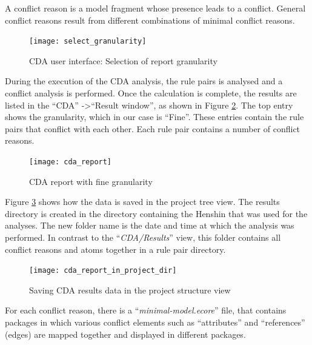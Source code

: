 A conflict reason is a model fragment whose presence leads to a conflict. General conflict reasons result from different combinations of minimal conflict reasons\cite{cda_api}.
\begin{figure}[h]
	\centering
	\texttt{[image: select\_granularity]}
	\caption{CDA user interface: Selection of report granularity}\label{fig:select_granularity}
\end{figure}
During the execution of the CDA analysis, the rule pairs is analysed and a conflict analysis is performed. Once the calculation is complete, the results are listed in the \enquote{CDA} -\textgreater \enquote{Result window}, as shown in Figure \ref{fig:cda_report}. The top entry shows the granularity, which in our case is \enquote{Fine}. These entries contain the rule pairs that conflict with each other. Each rule pair contains a number of conflict reasons.
\begin{figure}[h]
	\centering
	\texttt{[image: cda\_report]}
	\caption{CDA report with fine granularity}\label{fig:cda_report}
\end{figure}
Figure \ref{fig:cda_report_in_project_dir} shows how the data is saved in the project tree view. The results directory is created in the directory containing the Henshin that was used for the analyses. The new folder name is the date and time at which the analysis was performed. In contrast to the \enquote{\textit{CDA/Results}} view, this folder contains all conflict reasons and atoms together in a rule pair directory.
\begin{figure}[h]
	\centering
	\texttt{[image: cda\_report\_in\_project\_dir]}
	\caption{Saving CDA results data in the project structure view}\label{fig:cda_report_in_project_dir}
\end{figure}
For each conflict reason, there is a \enquote{\textit{minimal-model.ecore}} file, that contains packages in which various conflict elements such as \enquote{attributes} and \enquote{references} (edges) are mapped together and displayed in different packages.

